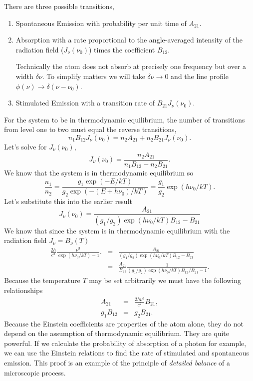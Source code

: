 There are three possible transitions,
\begin{enumerate}
\item {\rm Spontaneous Emission} with probability per unit time of
  $A_{21}$.
\item {\rm Absorption} with a rate proportional to the
  angle-averaged intensity of the radiation field ($J_\nu(\nu_0)$) times the
  coefficient $B_{12}$.  
  
  Technically the atom does not absorb at precisely one frequency
  but over a width $\delta \nu$.  To simplify matters we will take
  $\delta \nu \rightarrow 0$ and the line profile $\phi(\nu)
  \rightarrow \delta(\nu-\nu_0)$.
\item {\rm Stimulated Emission} with a transition rate of
  $B_{21} J_\nu(\nu_0)$.
\end{enumerate}

For the system to be in thermodynamic equilibrium, the number of
transitions from level one to two must equal the reverse transitions,
\begin{equation}
n_1 B_{12} J_\nu(\nu_0) = n_2 A_{21} + n_2 B_{21} J_\nu(\nu_0).
\label{eq:68}
\end{equation}
Let's solve for $J_\nu(\nu_0)$,
\begin{equation}
J_\nu(\nu_0) = \frac{n_2 A_{21}}{n_1 B_{12} - n_2 B_{21}}.
\label{eq:69}
\end{equation}
We know that the system is in thermodynamic equilibrium so 
\begin{equation}
\frac{n_1}{n_2} = \frac{g_1 \exp(-E/kT)}{g_2 \exp (-(E+h\nu_0)/kT)} =
\frac{g_1}{g_2} \exp (h\nu_0/kT).
\label{eq:70}
\end{equation}
Let's substitute this into the earlier result
\begin{equation}
J_\nu(\nu_0) = \frac{ A_{21}}{ (g_1/g_2) \exp(h\nu_0/kT) B_{12} - B_{21}}
\label{eq:71}
\end{equation}        
We know that since the system is in thermodynamic equilibrium with the
radiation field $J_\nu=B_\nu(T)$ 
\begin{eqnarray}
\frac{2 h}{c^2} \frac{\nu^3}{\exp ( h \nu_0 / k T) - 1}. &=& \frac{
  A_{21}}{ (g_1/g_2) \exp(h\nu_0/kT) B_{12} - B_{21}} \\
                                                        &=&
  \frac{A_{21}}{B_{21}} \frac{1}{(g_1/g_2) \exp(h\nu_0/kT) B_{12}/B_{21} - 1} .
\label{eq:72}
\end{eqnarray}
Because the temperature $T$ may be set arbitrarily we must have the
following relationships
\begin{eqnarray}
\label{eq:73}
A_{21} &=& \frac{2h\nu^3}{c^2} B_{21},\\
g_1 B_{12} &=& g_2 B_{21}.
\label{eq:74}
\end{eqnarray}
Because the Einstein coefficients are properties of the atom alone,
they do not depend on the assumption of thermodynamic equilibrium.
They are quite powerful.  If we calculate the probability of
absorption of a photon for example, we can use the Einstein relations
to find the rate of stimulated and spontaneous emission.   This proof
is an example of the principle of {\em detailed balance} of a
microscopic process.  

